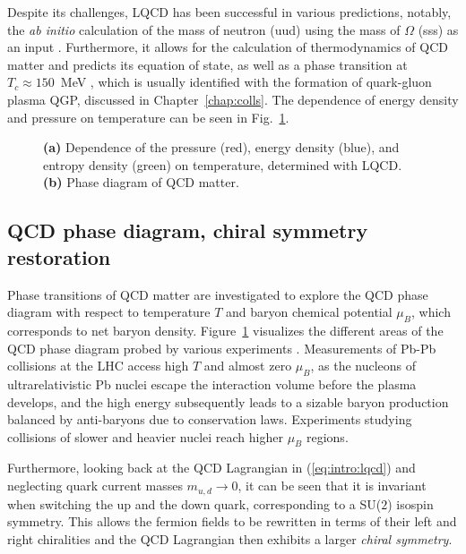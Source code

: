 Despite its challenges, LQCD has been successful in various predictions, notably, the \textit{ab initio} calculation of the mass of neutron (uud) using the mass of $\Omega$ (sss) as an input \cite{durrInitioDeterminationLight2008}. Furthermore, it allows for the calculation of thermodynamics of QCD matter and predicts its equation of state, as well as a phase transition at $T_c \approx 150$~MeV \cite{petreczkyLatticeQCDNonzero2012, bazavovEquationStateFlavor2014}, which is usually identified with the formation of quark-gluon plasma QGP, discussed in Chapter~\ref{chap:colls}. The dependence of energy density and pressure on temperature can be seen in Fig.~\ref{fig:intro:eos}.

\begin{figure}[H]
\hspace{1.5em}%
\caption{\textbf{(a)} Dependence of the pressure (red), energy density (blue), and entropy density (green) on temperature, determined with LQCD. \cite{bazavovEquationStateFlavor2014} \textbf{(b)} Phase diagram of QCD matter. \cite{pasechnikPhenomenologicalReviewQuark2017}}
\label{fig:intro:eos}
\end{figure}

\subsection{QCD phase diagram, chiral symmetry restoration}

Phase transitions of QCD matter are investigated to explore the QCD phase diagram with respect to temperature $T$ and baryon chemical potential $\mu_B$, which corresponds to net baryon density. Figure~\ref{fig:intro:eos} visualizes the different areas of the QCD phase diagram probed by various experiments \cite{pasechnikPhenomenologicalReviewQuark2017}. Measurements of Pb-Pb collisions at the LHC access high $T$ and almost zero $\mu_B$, as the nucleons of ultrarelativistic Pb nuclei escape the interaction volume before the plasma develops, and the high energy subsequently leads to a sizable baryon production balanced by anti-baryons due to conservation laws. Experiments studying collisions of slower and heavier nuclei reach higher $\mu_B$ regions.

Furthermore, looking back at the QCD Lagrangian in (\ref{eq:intro:lqcd}) and neglecting quark current masses $m_{u,d}\to 0$, it can be seen that it is invariant when switching the up and the down quark, corresponding to a SU($2$) isospin symmetry. This allows the fermion fields to be rewritten in terms of their left and right chiralities and the QCD Lagrangian then exhibits a larger \textit{chiral symmetry}.


